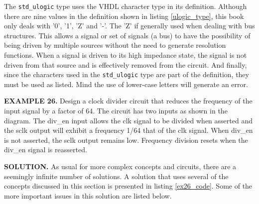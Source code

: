 The \texttt{std\_ulogic} type uses the VHDL character type in its definition. Although there are nine values in the definition shown in listing \ref{ulogic_type}, this book only deals with '0', '1', 'Z' and '-'. The 'Z' if generally used when dealing with bus structures. This allows a signal or set of signals (a bus) to have the possibility of being driven by multiple sources without the need to generate resolution functions. When a signal is driven to its high impedance state, the signal is not driven from that source and is effectively removed from the circuit. And finally, since the characters used in the \texttt{std\_ulogic} type are part of the definition, they must be used as listed. Mind the use of lower-case letters will generate an error. 
\begin{leftbar}
\begin{minipage}[t]{0.52\textwidth}
\noindent
\textbf{EXAMPLE 26.}
Design a clock divider circuit that reduces the frequency of the input signal by a factor of 64. The circuit has two inputs as shown in the diagram. The div\_en input allows the clk signal to be divided when asserted and the sclk output will exhibit a frequency 1/64 that of the clk signal. When div\_en is not asserted, the sclk output remains low. Frequency division resets when the div\_en signal is reasserted.
\end{minipage}
\begin{minipage}[t]{0.4\linewidth}
\vspace{10pt}
\begin{flushright}
\end{flushright}
\end{minipage}
\end{leftbar}
\noindent
\textbf{SOLUTION.} As usual for more complex concepts and circuits, there are a seemingly infinite number of solutions. A solution that uses several of the concepts discussed in this section is presented in listing \ref{ex26_code}. Some of the more important issues in this solution are listed below.

